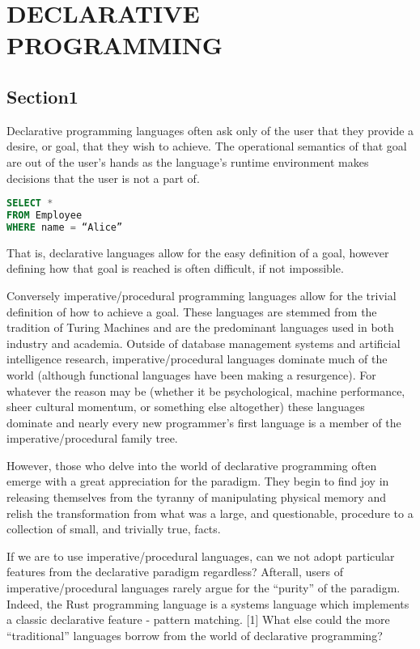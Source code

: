 \chapter{DECLARATIVE PROGRAMMING}
\section{Section1}
Declarative programming languages often ask only of the user that they provide a desire, or goal, that they wish to achieve. The operational semantics of that goal are out of the user’s hands as the language’s runtime environment makes decisions that the user is not a part of.

\begin{lstlisting}[language=SQL, caption=“Retrieve for me all employees whose name is Alice”. SQL is perhaps the most well known declarative language on the planet. Exactly how this data is stored or how the system retrieves it is usually of little concern to the user.]
SELECT *
FROM Employee
WHERE name = “Alice”
\end{lstlisting}

That is, declarative languages allow for the easy definition of a goal, however defining how that goal is reached is often difficult, if not impossible.

Conversely imperative/procedural programming languages allow for the trivial definition of how to achieve a goal. These languages are stemmed from the tradition of Turing Machines and are the predominant languages used in both industry and academia. Outside of database management systems and artificial intelligence research, imperative/procedural languages dominate much of the world (although functional languages have been making a resurgence). For whatever the reason may be (whether it be psychological, machine performance, sheer cultural momentum, or something else altogether) these languages dominate and nearly every new programmer’s first language is a member of the imperative/procedural family tree.

However, those who delve into the world of declarative programming often emerge with a great appreciation for the paradigm. They begin to find joy in releasing themselves from the tyranny of manipulating physical memory and relish the transformation from what was a large, and questionable, procedure to a collection of small, and trivially true, facts.

If we are to use imperative/procedural languages, can we not adopt particular features from the declarative paradigm regardless? Afterall, users of imperative/procedural languages rarely argue for the “purity” of the paradigm. Indeed, the Rust programming language is a systems language which implements a classic declarative feature - pattern matching. [1] What else could the more “traditional” languages borrow from the world of declarative programming?

